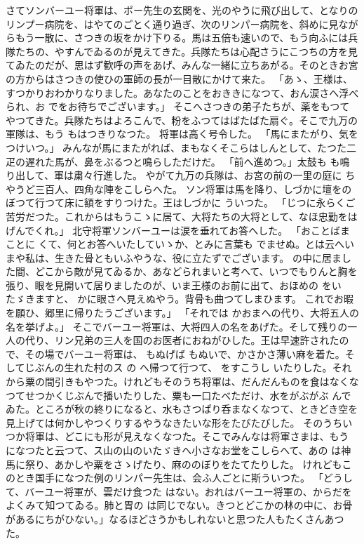 \documentclass[a4paper,
tate,
book]
{jlreq}
\begin{document}
  さてソンバーユー将軍は、ポー先生の玄関を、光のやうに飛び出して、となりのリンプー病院を、はやてのごとく通り過ぎ、次のリンパー病院を、斜めに見ながらもう一散に、さつきの坂をかけ下りる。馬は五倍も速いので、もう向ふには兵隊たちの、やすんでゐるのが見えてきた。兵隊たちは心配さうにこつちの方を見てゐたのだが、思はず歓呼の声をあげ、みんな一緒に立ちあがる。そのときお宮の方からはさつきの使ひの軍師の長が一目散にかけて来た。
「あゝ、王様は、すつかりおわかりなりました。あなたのことをおききになつて、おん涙さへ浮べられ、お でをお待ちでございます。」
  そこへさつきの弟子たちが、薬をもつてやつてきた。兵隊たちはよろこんで、粉をふつてはばたばた扇ぐ。そこで九万の軍隊は、もう もはつきりなつた。
  将軍は高く号令した。
「馬にまたがり、気をつけいつ。」
  みんなが馬にまたがれば、まもなくそこらはしんとして、たつた二疋の遅れた馬が、鼻をぶるつと鳴らしただけだ。
「前へ進めつ。」太鼓も も鳴り出して、軍は粛々行進した。
  やがて九万の兵隊は、お宮の前の一里の庭に ちやうど三百人、四角な陣をこしらへた。
  ソン将軍は馬を降り、しづかに壇をのぼつて行つて床に額をすりつけた。王はしづかに ういつた。
「じつに永らくご苦労だつた。これからはもうこゝに居て、大将たちの大将として、なほ忠勤をはげんでくれ。」
  北守将軍ソンバーユーは涙を垂れてお答へした。
「おことばまことに くて、何とお答へいたしていゝか、とみに言葉も でませぬ。とは云へいまや私は、生きた骨ともいふやうな、役に立たずでございます。 の中に居ました間、どこから敵が見てゐるか、あなどられまいと考へて、いつでもりんと胸を張り、眼を見開いて居りましたのが、いま王様のお前に出て、おほめの をいたゞきますと、 かに眼さへ見えぬやう。背骨も曲つてしまひます。 これでお暇を願ひ、郷里に帰りたうございます。」
「それでは かおまへの代り、大将五人の名を挙げよ。」
  そこでバーユー将軍は、大将四人の名をあげた。そして残りの一人の代り、リン兄弟の三人を国のお医者におねがひした。王は早速許されたので、その場でバーユー将軍は、 もぬげば もぬいで、かさかさ薄い麻を着た。そしてじぶんの生れた村のス の へ帰つて行つて、 をすこうし いたりした。それから粟の間引きもやつた。けれどもそのうち将軍は、だんだんものを食はなくなつてせつかくじぶんで播いたりした、粟も一口たべただけ、水をがぶがぶ んでゐた。ところが秋の終りになると、水もさつぱり呑まなくなつて、ときどき空を見上げては何かしやつくりするやうなきたいな形をたびたびした。
  そのうちいつか将軍は、どこにも形が見えなくなつた。そこでみんなは将軍さまは、もう になつたと云つて、ス山の山のいたゞきへ小さなお堂をこしらへて、あの は神馬に祭り、あかしや粟をさゝげたり、麻ののぼりをたてたりした。
  けれどもこのとき国手になつた例のリンパー先生は、会ふ人ごとに斯ういつた。
「どうして、バーユー将軍が、雲だけ食つた はない。おれはバーユー将軍の、からだをよくみて知つてゐる。肺と胃の は同じでない。きつとどこかの林の中に、お骨があるにちがひない。」なるほどさうかもしれないと思つた人もたくさんあつた。
\end{document}
